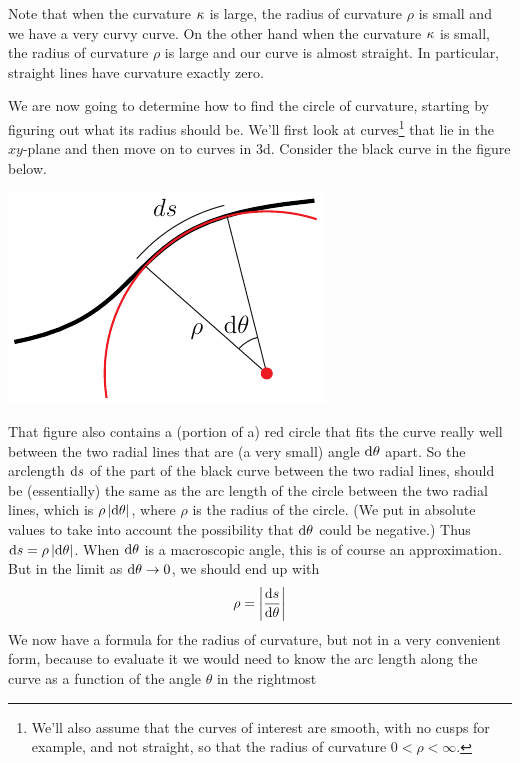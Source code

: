 Note that when the curvature $\kappa$ is large, the radius of curvature $\rho$
is small and we have a very curvy curve. On the other hand when the 
curvature $\kappa$ is small, the radius of curvature $\rho$ is large and 
our curve  is almost straight. In particular, straight lines have 
curvature exactly zero.

We are now going to determine how to find the circle of curvature,
starting by figuring out what its radius should be. We'll first look 
at curves\footnote{We'll also assume that the curves of interest are smooth,
with no cusps for example, and not straight, so that the radius of 
curvature $0<\rho<\infty$.} 
that lie in the $xy$-plane and then move on to curves in 3d. 
Consider the black curve in the figure below. 
\begin{efig}
\begin{center}
     \includegraphics{curvature.pdf}
\end{center}
\end{efig}
That figure also contains a (portion of a) red circle that fits the 
curve really well between the two radial lines that are (a very small) angle
$\mathrm{d}\theta$ apart. So the arclength $\mathrm{d}s$ of the part of the black 
curve between the two radial lines, should be (essentially) the same 
as the arc length of the circle between the two radial lines, which is 
$\rho\,|\mathrm{d}\theta|$, where $\rho$ is the radius of the circle. 
(We put in absolute values to take into account the
possibility that $\mathrm{d}\theta$ could be negative.)
Thus $\mathrm{d}s = \rho\,|\mathrm{d}\theta|$. When $\mathrm{d}\theta$ is a macroscopic
angle, this is of course an approximation. But in the limit as 
$\mathrm{d}\theta\rightarrow 0$, we should end up with
\begin{equation*}
\rho = \left|\diff{s}{\theta}\right|
\end{equation*} 
We now have a formula for the radius of curvature, but not in a very 
convenient form, because to evaluate it we would need to know the arc length
along the curve as a function of the angle $\theta$ in the rightmost 
